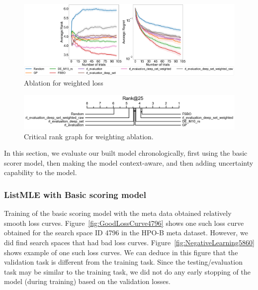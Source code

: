 \documentclass[12pt, twoside, ngerman]{report}
\begin{document}
\begin{figure}[h]
  \centering
    \includegraphics[scale=0.20]{images/RLDeepSetWeighted}
    \caption{Ablation for weighted loss}
    \label{fig:RLDeepSetWeighted}
\end{figure}

\begin{figure}[h]
  \centering
    \includegraphics[scale=0.35]{images/RLDeepSetWeightedRank25}
    \caption{Critical rank graph for weighting ablation.}
    \label{fig:RLDeepSetWeightedRank25}
\end{figure}

In this section, we evaluate our built model chronologically, first using the basic scorer model,  then making the model context-aware, and then adding uncertainty capability to the model.
\fi

\subsubsection{ListMLE with Basic scoring model}
Training of the basic scoring model with the meta data obtained relatively smooth loss curves.
Figure~\ref{fig:GoodLossCurve4796} shows one such loss curve obtained for the search space ID 4796 in the HPO-B meta dataset.
However,  we did find search spaces that had bad loss curves.
Figure~\ref{fig:NegativeLearning5860} shows example of one such loss curves.
We can deduce in this figure that the validation task is different from the training task.
Since the testing/evaluation task may be similar to the training task,  we did not do any early stopping of the model (during training) based on the validation losses.
\end{document}
